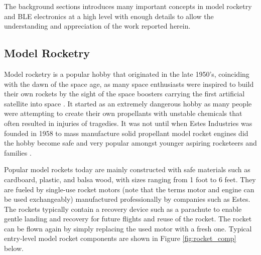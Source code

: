\documentclass{workreport}
\begin{document}
\begin{body}
	The background sections introduces many important concepts in model rocketry and BLE electronics at a high level with enough details to allow the understanding and appreciation of the work reported herein.


\subsection{Model Rocketry}

	Model rocketry is a popular hobby that originated in the late 1950's, coinciding with the dawn of the space age, as many space enthusiasts were inspired to build their own rockets by the sight of the space boosters carrying the first artificial satellite into space \cite{estes_rocket_tech}. It started as an extremely dangerous hobby as many people were attempting to create their own propellants with unstable chemicals that often resulted in injuries of tragedies. It was not until when Estes Industries was founded in 1958 to mass manufacture solid propellant model rocket engines did the hobby become safe and very popular amongst younger aspiring rocketeers and families \cite{estes_rocket_tech}.

	Popular model rockets today are mainly constructed with safe materials such as cardboard, plastic, and balsa wood, with sizes ranging from 1 foot to 6 feet. They are fueled by single-use rocket motors (note that the terms motor and engine can be used exchangeably) manufactured professionally by companies such as Estes. The rockets typically contain a recovery device such as a parachute to enable gentle landing and recovery for future flights and reuse of the rocket. The rocket can be flown again by simply replacing the used motor with a fresh one. Typical entry-level model rocket components are shown in Figure \ref{fig:rocket_comp} below.


\end{body}
\end{document}
